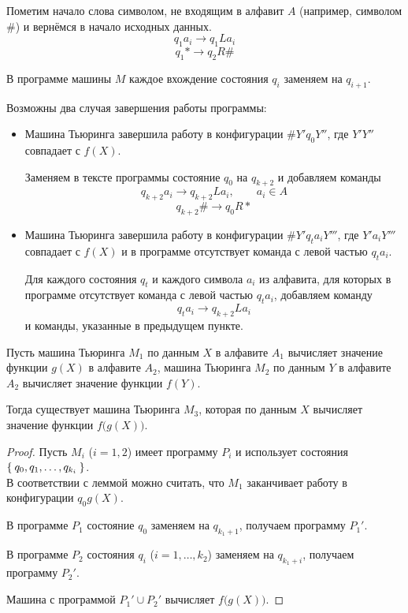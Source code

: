 \begin{eproof}
	\item Пометим начало слова символом, не входящим в алфавит $ A $ (например, символом \#) и вернёмся в начало исходных данных.
		$$ q_1 a_i \to q_1La_i $$
		$$ q_1* \to q_2R\# $$

	\item В программе машины $ M $ каждое вхождение состояния $ q_i $ заменяем на $ q_{i + 1} $.

	\item Возможны два случая завершения работы программы:
		\begin{itemize}
			\item Машина Тьюринга завершила работу в конфигурации $ \#Y'q_0Y'' $, где $ Y'Y'' $ совпадает с $ f(X) $.

				Заменяем в тексте программы состояние $ q_0 $ на $ q_{k + 2} $ и добавляем команды
			$$ q_{k + 2}a_i \to q_{k + 2}La_i, \qquad a_i \in A $$
			$$ q_{k + 2}\# \to q_0 R* $$

		\item Машина Тьюринга завершила работу в конфигурации $ \#Y'q_ta_iY''' $, где $ Y'a_iY''' $ совпадает с $ f(X) $ и в программе отсутствует команда с левой частью $ q_ta_i $.

			Для каждого состояния $ q_t $ и каждого символа $ a_i $ из алфавита, для которых в программе отсутствует команда с левой частью $ q_ta_i $, добавляем команду
			$$ q_ta_i \to q_{k + 2}La_i $$
			и команды, указанные в предыдущем пункте.
	\end{itemize}
\end{eproof}

\begin{theorem}
	Пусть машина Тьюринга $ M_1 $ по данным $ X $ в алфавите $ A_1 $ вычисляет значение функции $ g(X) $ в алфавите $ A_2 $, машина Тьюринга $ M_2 $ по данным $ Y $ в алфавите $ A_2 $ вычисляет значение функции $ f(Y) $.

	Тогда существует машина Тьюринга $ M_3 $, которая по данным $ X $ вычисляет значение функции $ f \bigl( g(X) \bigr) $.
\end{theorem}

\begin{proof}
	Пусть $ M_i $ ($ i = 1,2 $) имеет программу $ P_i $ и использует состояния $ \Set{q_0, q_1, \dots, q_{k_i}} $. \\
	В соответствии с леммой можно считать, что $ M_1 $ заканчивает работу в конфигурации $ q_0g(X) $.

	В программе $ P_1 $ состояние $ q_0 $ заменяем на $ q_{k_1 + 1} $, получаем программу $ P_1' $.

	В программе $ P_2 $ состояния $ q_i $ ($ i = 1, \dots, k_2 $) заменяем на $ q_{k_1 + i} $, получаем программу $ P_2' $.

	Машина с программой $ P_1' \cup P_2' $ вычисляет $ f \bigl( g(X) \bigr) $.
\end{proof}

